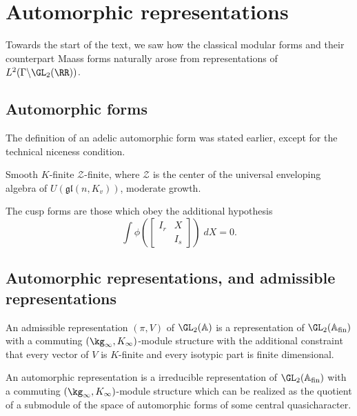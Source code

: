 \chapter{Automorphic representations}
Towards the start of the text,
we saw how the classical modular forms
and their counterpart Maass forms naturally arose from
representations of $L^2(\Gamma\backslash\GL_2(\RR))$.

%

\section{Automorphic forms}
The definition of an adelic automorphic form was stated earlier,
except for the technical niceness condition.
\begin{itemize}
  \ii Smooth
  \ii $K$-finite
  \ii $\mathcal Z$-finite, where $\mathcal Z$ is the center
  of the universal enveloping algebra of $U(\mathfrak{gl}(n, K_v))$,
  \ii moderate growth.
\end{itemize}
The \alert{cusp forms} are those which obey the additional hypothesis
\[
  \int \phi \left(
    \begin{bmatrix}
      I_r & X \\ & I_s
    \end{bmatrix}
  \right) \; dX = 0.
\]

\section{Automorphic representations, and admissible representations}
\begin{definition}
  An \alert{admissible representation} $(\pi, V)$
  of $\GL_2(\AA)$ is a representation of
  $\GL_2(\Af)$ with a commuting $(\kg_\infty, K_\infty)$-module structure
  with the additional constraint that
  every vector of $V$ is $K$-finite
  and every isotypic part is finite dimensional.
\end{definition}

\begin{definition}
  An \alert{automorphic representation} is a irreducible representation of
  $\GL_2(\Af)$ with a commuting $(\kg_\infty, K_\infty)$-module structure
  which can be realized as the quotient of a submodule
  of the space of automorphic forms of some central quasicharacter.
\end{definition}

